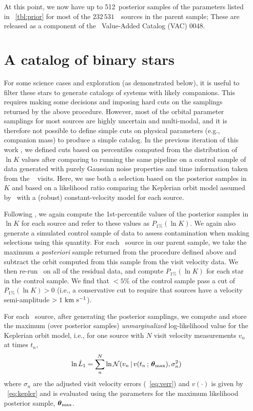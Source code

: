 \documentclass[modern]{aastex63}
\newcommand{\nsources}{\ensuremath{232\,531}}
\newcommand{\Kminval}{512}
\begin{document}
At this point, we now have up to \Kminval\ posterior samples of the parameters
listed in \tablename~\ref{tbl:prior} for most of the \nsources\ \apogee\ sources
in the parent sample; These are released as a component of the \sdss\
Value-Added Catalog (VAC) 0048.


\section{A catalog of binary stars} \label{sec:catalog}

For some science cases and exploration (as demonstrated below), it is useful to
filter these stars to generate catalogs of systems with likely companions.
This requires making some decisions and imposing hard cuts on the samplings
returned by the above procedure.
However, most of the orbital parameter samplings for most sources are highly
uncertain and multi-modal, and it is therefore not possible to define simple
cuts on physical parameters (e.g., companion mass) to produce a simple catalog.
In the previous iteration of this work \citep{Price-Whelan:2018}, we defined
cuts based on percentiles computed from the distribution of $\ln K$ values after
comparing to running the same pipeline on a control sample of data generated
with purely Gaussian noise properties and time information taken from the
\apogee\ \dr{14} visits.
Here, we use both a selection based on the posterior samples in $K$ and based on
a likelihood ratio comparing the Keplerian orbit model assumed by \thejoker\
with a (robust) constant-velocity model for each source.

Following \citet{Price-Whelan:2018}, we again compute the 1st-percentile values
of the posterior samples in $\ln K$ for each source and refer to these values as
$P_{1\%}(\ln K)$.
We again also generate a simulated control sample of data to assess
contamination when making selections using this quantity.
For each \apogee\ source in our parent sample, we take the maximum \textsl{a
posteriori} sample returned from the procedure defined above and subtract the
orbit computed from this sample from the visit velocity data.
We then re-run \thejoker\ on all of the residual data, and compute $P_{1\%}(\ln
K)$ for each star in the control sample.
We find that $<5\%$ of the control sample pass a cut of $P_{1\%}(\ln K) > 0$
(i.e., a conservative cut to require that sources have a velocity semi-amplitude
$> 1~\mathrm{km}~\mathrm{s}^{-1}$).

For each \apogee\ source, after generating the posterior samplings, we compute
and store the maximum (over posterior samples) \emph{unmarginalized}
log-likelihood value for the Keplerian orbit model, i.e., for one source with
$N$ visit velocity measurements $v_n$ at times $t_n$,
\begin{equation}
    \ln \hat{L}_1 = \sum_n^N \ln \mathcal{N}(v_n \given
        v(t_n \,;\, \bs{\theta}_{\mathrm{max}}), \sigma_n^2)
\end{equation}
where $\sigma_n$ are the adjusted visit velocity errors
(\equationname~\ref{eq:verr}) and $v(\cdot)$ is given by
\equationname~\ref{eq:kepler} and is evaluated using the parameters for the
maximum likelihood posterior sample, $\boldsymbol{\theta}_{\mathrm{max}}$.
\end{document}
